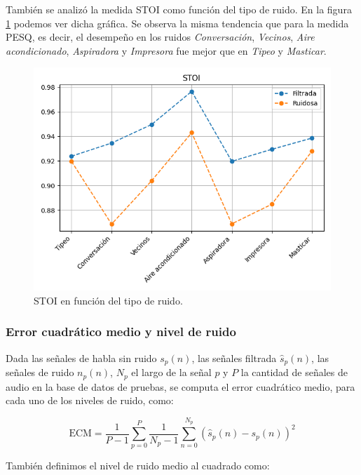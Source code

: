 También se analizó la medida STOI como función del tipo de ruido. En la figura \ref{fig:ch6_stoi_by_noise_type} podemos ver dicha gráfica. Se observa la misma tendencia que para la medida PESQ, es decir, el desempeño en los ruidos \emph{Conversación}, \emph{Vecinos}, \emph{Aire acondicionado}, \emph{Aspiradora} y \emph{Impresora} fue mejor que en \emph{Tipeo} y \emph{Masticar}.

\begin{figure}
	\centering
	\centerline{\includegraphics[scale=0.75]{images/ch6/stoi_by_noise_type.png}}
	\caption{STOI en función del tipo de ruido.}
	\label{fig:ch6_stoi_by_noise_type}
\end{figure} 

\subsubsection{Error cuadrático medio y nivel de ruido}

Dada las señales de habla sin ruido $s_p(n)$, las señales filtrada $\hat{s}_p(n)$, las señales de ruido $n_p(n)$, $N_p$ el largo de la señal $p$ y $P$ la cantidad de señales de audio en la base de datos de pruebas, se computa el error cuadrático medio, para cada uno de los niveles de ruido, como:

\begin{equation*}
	\text{ECM} = \frac{1}{P-1} \sum_{p=0}^{P} \frac{1}{N_p-1} \sum_{n=0}^{N_p} (\hat{s}_p(n) - s_p(n))^2
\end{equation*}

También definimos el nivel de ruido medio al cuadrado como:

